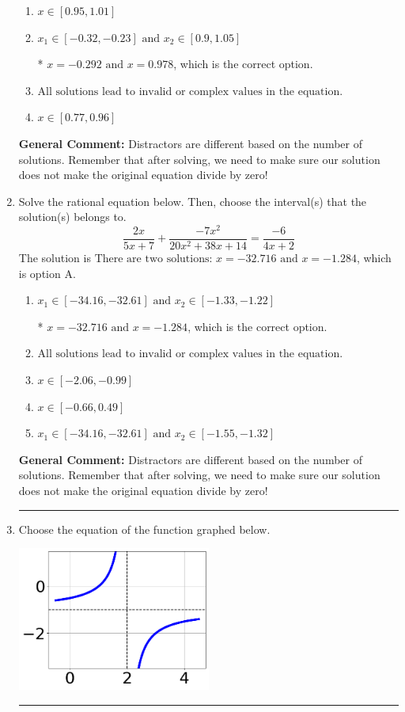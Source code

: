 \documentclass{extbook}[14pt]
\newcommand{\litem}[1]{\item #1

\rule{\textwidth}{0.4pt}}
\begin{document}
\begin{enumerate}
{\begin{enumerate}[label=\Alph*.]
\item \( x \in [0.95,1.01] \)


\item \( x_1 \in [-0.32, -0.23] \text{ and } x_2 \in [0.9,1.05] \)

* $x = -0.292 \text{ and } x = 0.978$, which is the correct option.
\item \( \text{All solutions lead to invalid or complex values in the equation.} \)


\item \( x \in [0.77,0.96] \)


\end{enumerate}

\textbf{General Comment:} Distractors are different based on the number of solutions. Remember that after solving, we need to make sure our solution does not make the original equation divide by zero!
}
\litem{
Solve the rational equation below. Then, choose the interval(s) that the solution(s) belongs to.
\[ \frac{2x}{5x + 7} + \frac{-7x^{2}}{20x^{2} +38 x + 14} = \frac{-6}{4x + 2} \]
The solution is \( \text{There are two solutions: } x = -32.716 \text{ and } x = -1.284 \), which is option A.\begin{enumerate}[label=\Alph*.]
\item \( x_1 \in [-34.16, -32.61] \text{ and } x_2 \in [-1.33,-1.22] \)

* $x = -32.716 \text{ and } x = -1.284$, which is the correct option.
\item \( \text{All solutions lead to invalid or complex values in the equation.} \)


\item \( x \in [-2.06,-0.99] \)


\item \( x \in [-0.66,0.49] \)


\item \( x_1 \in [-34.16, -32.61] \text{ and } x_2 \in [-1.55,-1.32] \)


\end{enumerate}

\textbf{General Comment:} Distractors are different based on the number of solutions. Remember that after solving, we need to make sure our solution does not make the original equation divide by zero!
}
\litem{
Choose the equation of the function graphed below.

\begin{center}
    \includegraphics[width=0.5\textwidth]{../Figures/rationalGraphToEquationCopyC.png}
\end{center}



}
\end{enumerate}
\end{document}
